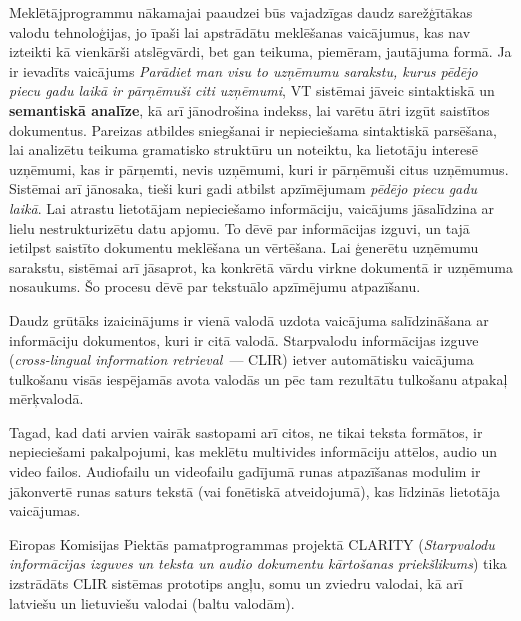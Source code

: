\begin{multicols}{2}

Meklētājprogrammu nākamajai paaudzei būs vajadzīgas daudz sarežģītākas valodu tehnoloģijas, jo īpaši lai apstrādātu meklēšanas vaicājumus, kas nav izteikti kā vienkārši atslēgvārdi, bet gan teikuma, piemēram, jautājuma formā.  Ja ir ievadīts vaicājums \textit{Parādiet man visu to uzņēmumu sarakstu, kurus pēdējo piecu gadu laikā ir pārņēmuši citi uzņēmumi}, VT sistēmai jāveic sintaktiskā un \textbf{semantiskā analīze}, kā arī jānodrošina indekss, lai \mbox{varētu} ātri izgūt saistītos dokumentus.  Pareizas atbildes sniegšanai ir nepieciešama sintaktiskā parsēšana, lai analizētu teikuma gramatisko struktūru un noteiktu, ka lietotāju interesē uzņēmumi, kas ir pārņemti, nevis uzņēmumi, kuri ir pārņēmuši citus uzņēmumus.  Sistēmai arī jānosaka, tieši kuri gadi atbilst apzīmējumam \textit{pēdējo piecu gadu laikā}.  Lai atrastu lietotājam nepieciešamo informāciju, vaicājums jāsalīdzina ar lielu nestrukturizētu datu apjomu.  To dēvē par informācijas izguvi, un tajā ietilpst saistīto dokumentu meklēšana un vērtēšana.  Lai ģenerētu uzņēmumu sarakstu, sistēmai arī jāsaprot, ka konkrētā vārdu virkne dokumentā ir uzņēmuma nosaukums.  Šo procesu dēvē par tekstuālo apzīmējumu atpazīšanu.

Daudz grūtāks izaicinājums ir vienā valodā uzdota vaicājuma salīdzināšana ar informāciju dokumentos, kuri ir citā valodā.  Starpvalodu informācijas izguve (\textit{cross-lingual information retrieval}~--- CLIR) ietver automātisku vaicājuma tulkošanu visās iespējamās avota valodās un pēc tam rezultātu tulkošanu atpakaļ mērķvalodā.

Tagad, kad dati arvien vairāk sastopami arī citos, ne tikai teksta formātos, ir nepieciešami pakalpojumi, kas meklētu multivides informāciju attēlos, audio un video failos.  Audiofailu un videofailu gadījumā runas atpazīšanas modulim ir jākonvertē runas saturs tekstā (vai fonētiskā atveidojumā), kas līdzinās lietotāja vaicājumas.

Eiropas Komisijas Piektās pamatprogrammas projektā CLARITY (\textit{Starpvalodu informācijas izguves un teksta un audio dokumentu kārtošanas priekšlikums}) tika izstrādāts CLIR sistēmas prototips angļu, somu un zviedru valodai, kā arī latviešu un lietuviešu valodai (baltu valodām).


\end{multicols}
